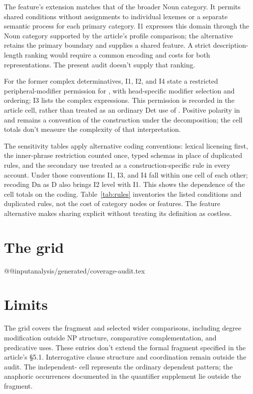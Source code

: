 \documentclass[12pt]{article}
\makeatletter
\newcommand{\tablebody}[1]{\csname @@input\endcsname #1 }
\makeatother
\begin{document}
The feature's extension matches that of the broader Noun category. It permits shared conditions without assignments to individual lexemes or a separate semantic process for each primary category. I1 expresses this domain through the Noun category supported by the article's profile comparison; the alternative retains the primary boundary and supplies a shared feature. A strict description-length ranking would require a common encoding and costs for both representations. The present audit doesn't supply that ranking.

For the former complex determinatives, I1, I2, and I4 state a restricted peripheral-modifier permission for , with head-specific modifier selection and ordering; I3 lists the complex expressions. This permission is recorded in the article cell, rather than treated as an ordinary Det use of . Positive polarity in  and  remains a convention of the construction under the decomposition; the cell totals don't measure the complexity of that interpretation.

The sensitivity tables apply alternative coding conventions: lexical licensing first, the inner-phrase restriction counted once, typed schemas in place of duplicated rules, and the secondary use treated as a construction-specific rule in every account. Under those conventions I1, I3, and I4 fall within one cell of each other; recoding Dn as D also brings I2 level with I1. This shows the dependence of the cell totals on the coding. Table~\ref{tab:rules} inventories the listed conditions and duplicated rules, not the cost of category nodes or features. The feature alternative makes sharing explicit without treating its definition as costless.

\section{The grid}

\tablebody{analysis/generated/coverage-audit.tex}

\section{Limits}

The grid covers the fragment and selected wider comparisons, including degree modification outside NP structure, comparative complementation, and predicative uses. These entries don't extend the formal fragment specified in the article's §5.1. Interrogative clause structure and coordination remain outside the audit. The independent- cell represents the ordinary dependent pattern; the anaphoric occurrences documented in the quantifier supplement lie outside the fragment.
\end{document}
